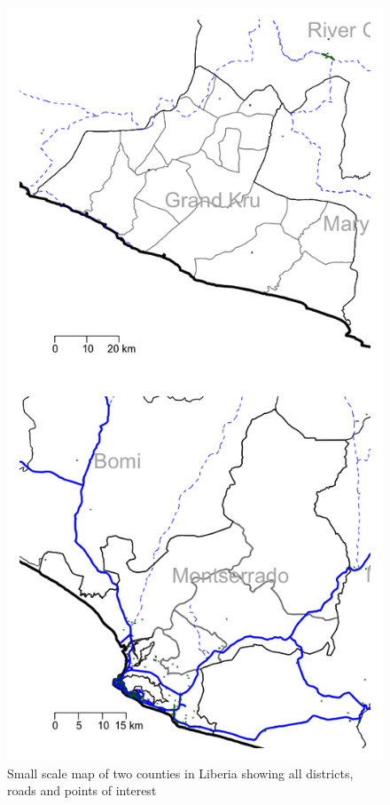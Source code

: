 \documentclass[12pt,a4paper]{book}
\theoremstyle{definition}
\theoremstyle{definition}
\theoremstyle{definition}
\theoremstyle{remark}
\begin{document}
\begin{figure}[H]

{\centering \includegraphics{figures/smallScaleMapCounty-1} 

}

\caption{Small scale map of two counties in Liberia showing all districts, roads and points of interest}\label{fig:smallScaleMapCounty}
\end{figure}\newpage
\end{document}
